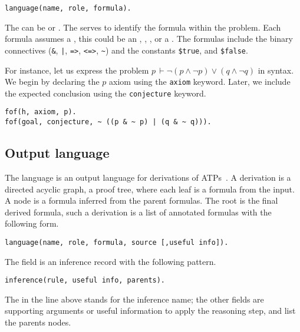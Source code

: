 \documentclass[../main.tex]{subfiles}
\begin{document}
\begin{verbatim}
language(name, role, formula).
\end{verbatim}

The  can be  or . The 
serves to identify the formula within the problem. Each formula
assumes a , this could be an ,
, ,  or a .
The formulas include the binary connectives
(\verb!&!, \verb!|!, \verb!=>!, \verb!<=>!, \verb!~!)
and the constants \verb!$true!, and \verb!$false!.

For instance, let us express the problem
$p\, \vdash \neg (p \wedge \neg p) ∨ (q \wedge \neg q)$
in \TPTP syntax. We begin by declaring the $p$ axiom using the \verb!axiom!
keyword. Later, we include the expected conclusion using the
\verb!conjecture! keyword.

\begin{verbatim}
fof(h, axiom, p).
fof(goal, conjecture, ~ ((p & ~ p) | (q & ~ q))).
\end{verbatim}

\subsection{Output language}
\label{ssec:output-language}

The \TSTP language is an output language for derivations of
ATPs~\cite{Sutcliffe-Schulz-Claessen-VanGelder-2006,Sicard-Ramirez2016}.
A \TSTP derivation is a directed acyclic graph, a proof tree,
where each leaf is a formula from the \TPTP input. A node is a formula
inferred from the parent formulas. The root is the final derived formula,
such a derivation is a list of annotated formulas with the following form.

\begin{verbatim}
language(name, role, formula, source [,useful info]).
\end{verbatim}

The  field is an inference record with the following
pattern.

\begin{verbatim}
inference(rule, useful info, parents).
\end{verbatim}

The  in the line above stands for the inference name;
the other fields are supporting arguments or useful information to
apply the reasoning step, and list the parents nodes.
\end{document}
